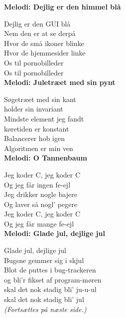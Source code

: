 
\vspace{-5.5mm}
\textbf{Melodi: Dejlig er den himmel blå}

Dejlig er den GUI blå\\
Nem den er at se derpå\\
Hvor de små ikoner blinke\\
Hvor de hjemmesider linke\\
Os til pornobilleder\\
Os til pornobilleder\\


\vspace{-2.5mm}
\textbf{Melodi: Juletræet med sin pynt}

Søgetræet med sin kant\\
holder sin invariant\\
Mindste element jeg fandt\\
køretiden er konstant\\
Balancerer hob igen\\
Algoritmen er min ven\\


\vspace{-2.5mm}
\textbf{Melodi: O Tannenbaum}

Jeg koder C, jeg koder C\\
Og jeg får ingen fe-ejl\\
Jeg drikker nogle bajere\\
Og laver så nogl' pegere\\
Jeg koder C, jeg koder C\\
Og jeg får mange fe-ejl\\


\vspace{-2.5mm}
\textbf{Melodi: Glade jul, dejlige jul}

Glade jul, dejlige jul\\
Bugsne gemmer sig i skjul\\
Blot de puttes i bug-trackeren\\
og bli'r fikset af program-møren\\
skal det nok stadig bli' ju-u-ul\\
skal det nok stadig bli' jul\\

\emph{(Fortsættes på næste side.)}

\newpage



